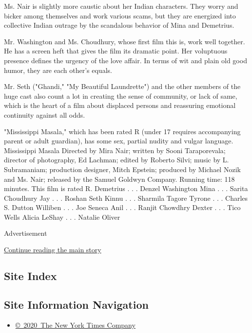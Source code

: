 Ms. Nair is slightly more caustic about her Indian characters. They
worry and bicker among themselves and work various scams, but they are
energized into collective Indian outrage by the scandalous behavior of
Mina and Demetrius.

Mr. Washington and Ms. Choudhury, whose first film this is, work well
together. He has a screen heft that gives the film its dramatic point.
Her voluptuous presence defines the urgency of the love affair. In terms
of wit and plain old good humor, they are each other's equals.

Mr. Seth ("Ghandi," "My Beautiful Laundrette") and the other members of
the huge cast also count a lot in creating the sense of community, or
lack of same, which is the heart of a film about displaced persons and
reassuring emotional continuity against all odds.

"Mississippi Masala," which has been rated R (under 17 requires
accompanying parent or adult guardian), has some sex, partial nudity and
vulgar language. Mississippi Masala Directed by Mira Nair; written by
Sooni Taraporevala; director of photography, Ed Lachman; edited by
Roberto Silvi; music by L. Subramaniam; production designer, Mitch
Epstein; produced by Michael Nozik and Ms. Nair; released by the Samuel
Goldwyn Company. Running time: 118 minutes. This film is rated R.
Demetrius . . . Denzel Washington Mina . . . Sarita Choudhury Jay . . .
Roshan Seth Kinnu . . . Sharmila Tagore Tyrone . . . Charles S. Dutton
Williben . . . Joe Seneca Anil . . . Ranjit Chowdhry Dexter . . . Tico
Wells Alicia LeShay . . . Natalie Oliver

Advertisement

\protect\hyperlink{after-bottom}{Continue reading the main story}

\hypertarget{site-index}{%
\subsection{Site Index}\label{site-index}}

\hypertarget{site-information-navigation}{%
\subsection{Site Information
Navigation}\label{site-information-navigation}}

\begin{itemize}
\tightlist
\item
  \href{https://help.nytimes.com/hc/en-us/articles/115014792127-Copyright-notice}{©~2020~The
  New York Times Company}
\end{itemize}

